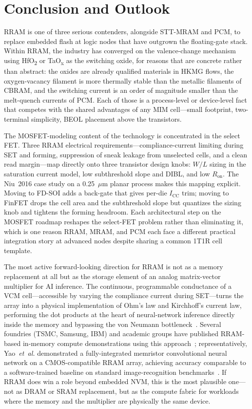\documentclass[lettersize,journal]{IEEEtran}
\begin{document}
\section{Conclusion and Outlook}\label{sec:conclusion}
RRAM is one of three serious contenders, alongside STT-MRAM and PCM, to replace embedded flash at logic nodes that have outgrown the floating-gate stack. Within RRAM, the industry has converged on the valence-change mechanism using HfO\textsubscript{2} or TaO\textsubscript{x} as the switching oxide, for reasons that are concrete rather than abstract: the oxides are already qualified materials in HKMG flows, the oxygen-vacancy filament is more thermally stable than the metallic filaments of CBRAM, and the switching current is an order of magnitude smaller than the melt-quench currents of PCM. Each of those is a process-level or device-level fact that competes with the shared advantages of any MIM cell---small footprint, two-terminal simplicity, BEOL placement above the transistors.

The MOSFET-modeling content of the technology is concentrated in the select FET. Three RRAM electrical requirements---compliance-current limiting during SET and forming, suppression of sneak leakage from unselected cells, and a clean read margin---map directly onto three transistor design knobs: $W/L$ sizing in the saturation current model, low subthreshold slope and DIBL, and low $R_\mathrm{on}$. The Niu~2016 case study on a 0.25~$\mu$m planar process makes this mapping explicit. Moving to FD-SOI adds a back-gate that gives per-die $I_\mathrm{CC}$ trim; moving to FinFET drops the cell area and the subthreshold slope but quantizes the sizing knob and tightens the forming headroom. Each architectural step on the MOSFET roadmap reshapes the select-FET problem rather than eliminating it, which is one reason RRAM, MRAM, and PCM each face a different practical integration story at advanced nodes despite sharing a common 1T1R cell template.

The most active forward-looking direction for RRAM is not as a memory replacement at all but as the storage element of an analog matrix-vector multiplier for AI inference. The continuous, programmable conductance of a VCM cell---accessible by varying the compliance current during SET---turns the array into a physical implementation of Ohm's law and Kirchhoff's current law, performing the dot products at the heart of neural-network inference directly inside the memory and bypassing the von Neumann bottleneck~\cite{ref_ielmini_wong2018}. Several foundries (TSMC, Samsung, IBM) and academic groups have published RRAM-based in-memory compute demonstrations using this approach~\cite{ref_hellenbrand2024,ref_ielmini_wong2018}; representatively, Yao~\textit{et~al.} demonstrated a fully-integrated memristor convolutional neural network on a CMOS-compatible RRAM array, achieving accuracy comparable to a software-trained baseline on standard image-recognition benchmarks~\cite{ref_yao2020}. If RRAM does win a role beyond embedded NVM, this is the most plausible one---not as DRAM or SRAM replacement, but as the compute fabric for workloads where the memory and the multiplier are physically the same device.
\end{document}
